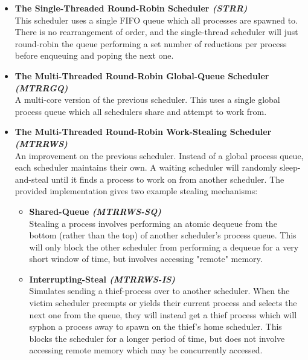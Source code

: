 \begin{itemize}
    \item {\bf The Single-Threaded Round-Robin Scheduler {\sl (STRR)}} \\
        This scheduler uses a single FIFO queue which all processes are spawned 
        to. There is no rearrangement of order, and the single-thread scheduler 
        will just round-robin the queue performing a set number of reductions
        per process before enqueuing and poping the next one.

    \item {\bf The Multi-Threaded Round-Robin Global-Queue Scheduler {\sl (MTRRGQ)}} \\
        A multi-core version of the previous scheduler. This uses a single global
        process queue which all schedulers share and attempt to work from.

    \item {\bf The Multi-Threaded Round-Robin Work-Stealing Scheduler {\sl (MTRRWS)}} \\
        An improvement on the previous scheduler. Instead of a global process 
        queue, each scheduler maintains their own. A waiting scheduler will randomly 
        sleep-and-steal until it finds a process to work on from another scheduler. 
        The provided implementation gives two example stealing mechanisms:
        \begin{itemize}
            \item {\bf Shared-Queue {\sl (MTRRWS-SQ)}} \\
                Stealing a process involves performing an atomic dequeue from 
                the bottom (rather than the top) of another scheduler's process 
                queue. This will only block the other scheduler from performing
                a dequeue for a very short window of time, but involves 
                accessing "remote" memory.
            \item {\bf Interrupting-Steal {\sl (MTRRWS-IS)}} \\
                Simulates sending a thief-process over to another scheduler.
                When the victim scheduler preempts or yields their current process
                and selects the next one from the queue, they will instead get a
                thief process which will syphon a process away to spawn on the thief's home
                scheduler. This blocks the scheduler for a longer period of time,
                but does not involve accessing remote memory which may be 
                concurrently accessed.
        \end{itemize}
\end{itemize}

